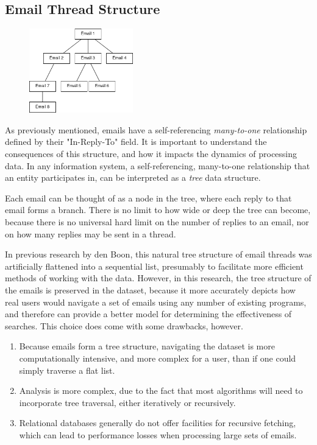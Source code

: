 \documentclass[a4paper, 12pt]{article}
\begin{document}
	\subsection{Email Thread Structure}
		\begin{figure}
			\label{fig:email-threads}
			\includegraphics[width=0.4\textwidth]{img/email-threads.png}
		\end{figure}
	
		As previously mentioned, emails have a self-referencing \textit{many-to-one} relationship defined by their "In-Reply-To" field. It is important to understand the consequences of this structure, and how it impacts the dynamics of processing data. In any information system, a self-referencing, many-to-one relationship that an entity participates in, can be interpreted as a \textit{tree} data structure.
	
		Each email can be thought of as a node in the tree, where each reply to that email forms a branch. There is no limit to how wide or deep the tree can become, because there is no universal hard limit on the number of replies to an email, nor on how many replies may be sent in a thread.
		
		In previous research by den Boon, this natural tree structure of email threads was artificially flattened into a sequential list, presumably to facilitate more efficient methods of working with the data\autocite{denboon}. However, in this research, the tree structure of the emails is preserved in the dataset, because it more accurately depicts how real users would navigate a set of emails using any number of existing programs, and therefore can provide a better model for determining the effectiveness of searches. This choice does come with some drawbacks, however.
		
		\begin{enumerate}
			\item Because emails form a tree structure, navigating the dataset is more computationally intensive, and more complex for a user, than if one could simply traverse a flat list.
			\item Analysis is more complex, due to the fact that most algorithms will need to incorporate tree traversal, either iteratively or recursively.
			\item Relational databases generally do not offer facilities for recursive fetching, which can lead to performance losses when processing large sets of emails.
		\end{enumerate}
	
\end{document}
